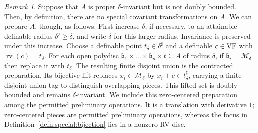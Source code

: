 \documentclass[12pt]{amsart}
\theoremstyle{plain}
\theoremstyle{definition}
\theoremstyle{remark}
\newtheorem{rem}[thm]{Remark}
\numberwithin{equation}{section}
\theoremstyle{plain}
\newcommand{\VF}{\textup{VF}}
\newcommand{\MM}{\mdl M}
\newcommand{\gb}{\mathfrak{b}}
\newcommand{\0}{\emptyset}
\newcommand{\mdl}[1]{\mathcal{#1}}  %
\newcommand{\sub}{\subseteq}
\DeclareMathOperator{\rv}{rv}
\begin{document}
\begin{rem}\label{spec:addendum}
Suppose that $A$ is proper $\delta$-invariant but is not doubly bounded. Then, by definition, there  are no special covariant transformations on $A$. We can prepare $A$, though, as follows. First increase $\delta$, if necessary, to an attainable definable radius $\delta'\geq\delta$, and write $\delta$ for this larger radius. Invariance is preserved under this increase. Choose a definable point $t_\delta\in\delta^\sharp$ and a definable $c\in\VF$ with $\rv(c)=t_\delta$. For each open polydisc $\gb_1 \times \ldots \times \gb_n \times t \sub A$ of radius $\delta$, if $\gb_i= \MM_\delta$ then replace it with $t_\delta$. The resulting finite disjoint union is the contracted preparation. Its bijective lift replaces $x_i\in\MM_\delta$ by $x_i+c\in t_\delta^\sharp$, carrying a finite disjoint-union tag to distinguish overlapping pieces. This lifted set is doubly bounded and remains $\delta$-invariant. We include this zero-centered preparation among the permitted preliminary operations. It is a translation with derivative $1$; zero-centered pieces are permitted preliminary operations, whereas the focus in Definition~\ref{defn:special:bijection} lies in a nonzero RV-disc.
\end{rem}
\end{document}
